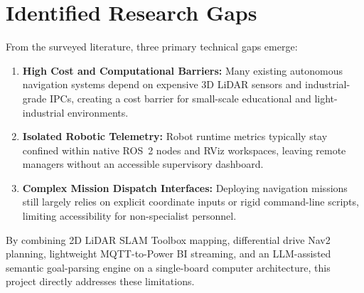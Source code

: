 \section{Identified Research Gaps}
From the surveyed literature, three primary technical gaps emerge:
\begin{enumerate}
    \item \textbf{High Cost and Computational Barriers:} Many existing autonomous navigation systems depend on expensive 3D LiDAR sensors and industrial-grade IPCs, creating a cost barrier for small-scale educational and light-industrial environments.
    \item \textbf{Isolated Robotic Telemetry:} Robot runtime metrics typically stay confined within native ROS~2 nodes and RViz workspaces, leaving remote managers without an accessible supervisory dashboard.
    \item \textbf{Complex Mission Dispatch Interfaces:} Deploying navigation missions still largely relies on explicit coordinate inputs or rigid command-line scripts, limiting accessibility for non-specialist personnel.
\end{enumerate}

By combining 2D LiDAR SLAM Toolbox mapping, differential drive Nav2 planning, lightweight MQTT-to-Power BI streaming, and an LLM-assisted semantic goal-parsing engine on a single-board computer architecture, this project directly addresses these limitations.